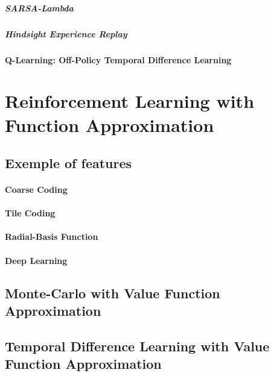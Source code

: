 			\subparagraph*{SARSA-Lambda}
			\subparagraph*{Hindsight Experience Replay}

		\paragraph*{Q-Learning: Off-Policy Temporal Difference Learning}



\section{Reinforcement Learning with Function Approximation} %
	\label{sec:reinforcement_learning_with_function_approximation}

	\subsection{Exemple of features} %
		\label{sub:exemple_of_features}

		\paragraph*{Coarse Coding}
		\paragraph*{Tile Coding}
		\paragraph*{Radial-Basis Function}
		\paragraph*{Deep Learning}

	\subsection{Monte-Carlo with Value Function Approximation} %
		\label{sub:monte_carlo_with_value_function_approximation}
	
	
	\subsection{Temporal Difference Learning with Value Function Approximation} %
	\label{sub:temporal_difference_learning_with_value_function_approximation}

